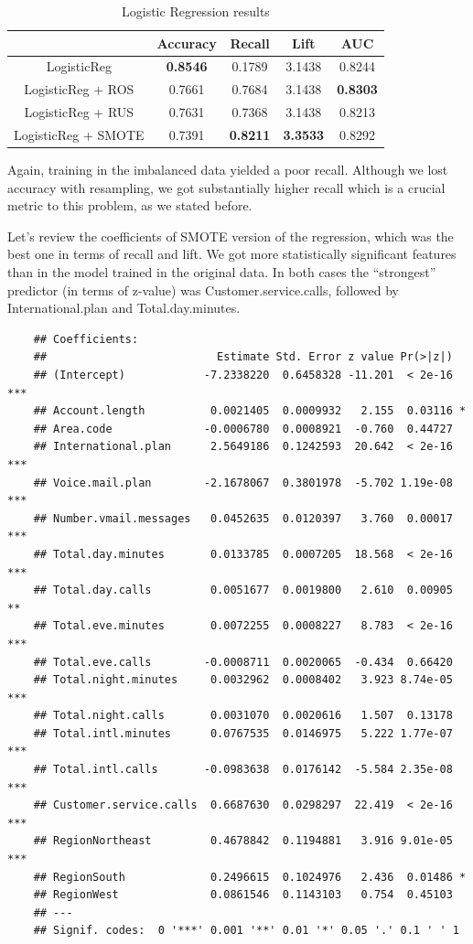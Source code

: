 \documentclass[12pt,letterpaper]{article}
\begin{document}
 \begin{table}[!htb]
 	\centering
 	\addtolength{\tabcolsep}{6pt}
 	\begin{tabular}{|c|cccc|}
 		\hline
 		& Accuracy & Recall & Lift & AUC \\ 
 		\hline
 		LogisticReg  & \textbf{0.8546} & 0.1789 & 3.1438 & 0.8244 \\ 
 		LogisticReg + ROS & 0.7661 & 0.7684 & 3.1438 & \textbf{0.8303} \\ 
 		LogisticReg + RUS & 0.7631 & 0.7368 & 3.1438 & 0.8213 \\ 
 		LogisticReg + SMOTE & 0.7391 &\textbf{ 0.8211} &\textbf{ 3.3533} & 0.8292 \\ 
 		\hline
 	\end{tabular}
 \caption{Logistic Regression results}
 \label{logit}
 \end{table}
 
Again, training in the imbalanced data yielded a poor recall. Although we lost accuracy with resampling, we got substantially higher recall which is a crucial metric to this problem, as we stated before. 

Let’s review the coefficients of SMOTE version of the regression, which was the best one in terms of recall and lift. We got more statistically significant features than in the model trained in the original data. In both cases the “strongest” predictor (in terms of z-value) was Customer.service.calls, followed by International.plan and Total.day.minutes.
 \begin{lstlisting}
 	## Coefficients:
 	##                          Estimate Std. Error z value Pr(>|z|)    
 	## (Intercept)            -7.2338220  0.6458328 -11.201  < 2e-16 ***
 	## Account.length          0.0021405  0.0009932   2.155  0.03116 *  
 	## Area.code              -0.0006780  0.0008921  -0.760  0.44727    
 	## International.plan      2.5649186  0.1242593  20.642  < 2e-16 ***
 	## Voice.mail.plan        -2.1678067  0.3801978  -5.702 1.19e-08 ***
 	## Number.vmail.messages   0.0452635  0.0120397   3.760  0.00017 ***
 	## Total.day.minutes       0.0133785  0.0007205  18.568  < 2e-16 ***
 	## Total.day.calls         0.0051677  0.0019800   2.610  0.00905 ** 
 	## Total.eve.minutes       0.0072255  0.0008227   8.783  < 2e-16 ***
 	## Total.eve.calls        -0.0008711  0.0020065  -0.434  0.66420    
 	## Total.night.minutes     0.0032962  0.0008402   3.923 8.74e-05 ***
 	## Total.night.calls       0.0031070  0.0020616   1.507  0.13178    
 	## Total.intl.minutes      0.0767535  0.0146975   5.222 1.77e-07 ***
 	## Total.intl.calls       -0.0983638  0.0176142  -5.584 2.35e-08 ***
 	## Customer.service.calls  0.6687630  0.0298297  22.419  < 2e-16 ***
 	## RegionNortheast         0.4678842  0.1194881   3.916 9.01e-05 ***
 	## RegionSouth             0.2496615  0.1024976   2.436  0.01486 *  
 	## RegionWest              0.0861546  0.1143103   0.754  0.45103    
 	## ---
 	## Signif. codes:  0 '***' 0.001 '**' 0.01 '*' 0.05 '.' 0.1 ' ' 1
 \end{lstlisting}
\end{document}
